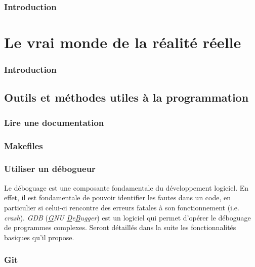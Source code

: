 \documentclass{minitelreport}
\begin{document}
\begin{refsection}
	\section*{Introduction}
	
\part{Le vrai monde de la réalité réelle}
\label{part:le_vrai_monde_de_la_réalité_réelle}
	\section*{Introduction}
	
	\chapter{Outils et méthodes utiles à la programmation}
	\label{chap:outils_et_méthodes}
		\section{Lire une documentation}
			\label{sec:lire_une_documentation}
			
		\section{Makefiles}
			\label{sec:makefiles}
			
		\section{Utiliser un débogueur}
			\label{sec:utiliser_un_d_bogueur}
		Le déboguage est une composante fondamentale du développement logiciel. En effet, il est fondamentale de pouvoir identifier les fautes dans un code, en particulier si celui-ci rencontre des erreurs fatales à son fonctionnement (i.e. \textit{crash}). \textit{GDB} (\textit{\underline{G}NU \underline{D}e\underline{B}ugger}) est un logiciel qui permet d'opérer le déboguage de programmes complexes. Seront détaillés dans la suite les fonctionnalités basiques qu'il propose.
		\section{Git}

\end{refsection}
\end{document}
